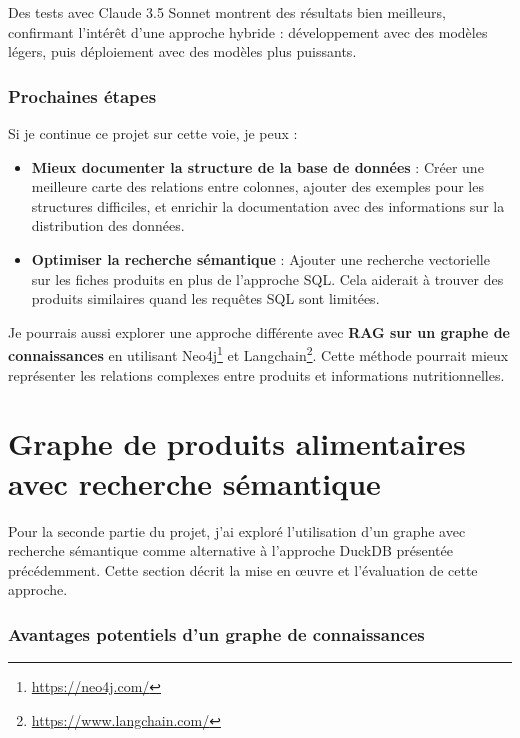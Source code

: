 \documentclass[a4paper,11pt]{article}
\begin{document}
\vskip 0.1cm
Des tests avec Claude 3.5 Sonnet montrent des résultats bien meilleurs, confirmant l'intérêt d'une approche hybride : développement avec des modèles légers, puis déploiement avec des modèles plus puissants.



\section{Prochaines étapes}
\label{sec:next}

Si je continue ce projet sur cette voie, je peux :
\begin{itemize}
\item \textbf{Mieux documenter la structure de la base de données} : Créer une meilleure carte des relations entre colonnes, ajouter des exemples pour les structures difficiles, et enrichir la documentation avec des informations sur la distribution des données.
\item \textbf{Optimiser la recherche sémantique} : Ajouter une recherche vectorielle sur les fiches produits en plus de l'approche SQL. Cela aiderait à trouver des produits similaires quand les requêtes SQL sont limitées.
\end{itemize}

\vskip 0.1cm
Je pourrais aussi explorer une approche différente avec \textbf{RAG sur un graphe de connaissances} en utilisant Neo4j\footnote{\url{https://neo4j.com/}} et 
Langchain\footnote{\url{https://www.langchain.com/}}. Cette méthode pourrait mieux représenter les relations complexes entre produits et informations nutritionnelles.






\part{Graphe de produits alimentaires avec recherche sémantique}
\label{part:graphe}

Pour la seconde partie du projet, j'ai exploré l'utilisation d'un graphe avec recherche sémantique comme alternative à l'approche DuckDB présentée précédemment. Cette section décrit la mise en œuvre et l'évaluation de cette approche.

\section{Avantages potentiels d'un graphe de connaissances}
\label{sec:avantages-graphe}
\end{document}
